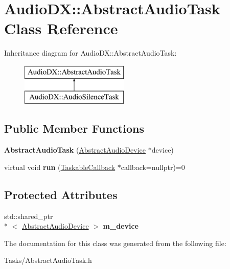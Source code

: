 \hypertarget{class_audio_d_x_1_1_abstract_audio_task}{\section{Audio\-D\-X\-:\-:Abstract\-Audio\-Task Class Reference}
\label{class_audio_d_x_1_1_abstract_audio_task}
}
Inheritance diagram for Audio\-D\-X\-:\-:Abstract\-Audio\-Task\-:\begin{figure}[H]
\begin{center}
\leavevmode
\includegraphics[height=2.000000cm]{class_audio_d_x_1_1_abstract_audio_task}
\end{center}
\end{figure}
\subsection*{Public Member Functions}
\begin{DoxyCompactItemize}
\item 
\hypertarget{class_audio_d_x_1_1_abstract_audio_task_adbb6d415b699251831bd119924ffcb32}{{\bfseries Abstract\-Audio\-Task} (\hyperlink{class_audio_d_x_1_1_abstract_audio_device}{Abstract\-Audio\-Device} $\ast$device)}\label{class_audio_d_x_1_1_abstract_audio_task_adbb6d415b699251831bd119924ffcb32}

\item 
\hypertarget{class_audio_d_x_1_1_abstract_audio_task_a1dabc891ee283d1e97c6cc3147fd79b8}{virtual void {\bfseries run} (\hyperlink{class_taskable_callback}{Taskable\-Callback} $\ast$callback=nullptr)=0}\label{class_audio_d_x_1_1_abstract_audio_task_a1dabc891ee283d1e97c6cc3147fd79b8}

\end{DoxyCompactItemize}
\subsection*{Protected Attributes}
\begin{DoxyCompactItemize}
\item 
\hypertarget{class_audio_d_x_1_1_abstract_audio_task_a5250f630cad2fc3501007f8e9712e847}{std\-::shared\-\_\-ptr\\*
$<$ \hyperlink{class_audio_d_x_1_1_abstract_audio_device}{Abstract\-Audio\-Device} $>$ {\bfseries m\-\_\-device}}\label{class_audio_d_x_1_1_abstract_audio_task_a5250f630cad2fc3501007f8e9712e847}

\end{DoxyCompactItemize}


The documentation for this class was generated from the following file\-:\begin{DoxyCompactItemize}
\item 
Tasks/Abstract\-Audio\-Task.\-h\end{DoxyCompactItemize}
